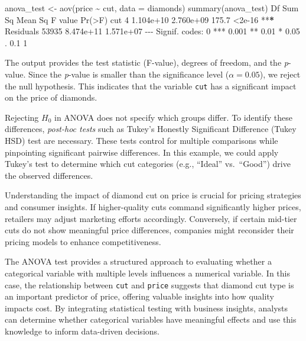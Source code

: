 \documentclass[
  11pt,
]{book}
\makeatletter
\newenvironment{Shaded}{}{}
\newcommand{\AttributeTok}[1]{#1}
\newcommand{\DecValTok}[1]{#1}
\newcommand{\ErrorTok}[1]{\textcolor[rgb]{0.21,0.21,0.21}{\textbf{#1}}}
\newcommand{\FloatTok}[1]{#1}
\newcommand{\FunctionTok}[1]{#1}
\newcommand{\NormalTok}[1]{#1}
\newcommand{\OtherTok}[1]{\textcolor[rgb]{0.39,0.39,0.39}{#1}}
\newcommand{\SpecialCharTok}[1]{\textcolor[rgb]{0.39,0.39,0.39}{#1}}
\newcommand{\StringTok}[1]{\textcolor[rgb]{0.39,0.39,0.39}{#1}}
\newenvironment{kframe}{%
\medskip{}
\setlength{\fboxsep}{.8em}
 \def\at@end@of@kframe{}%
 \ifinner\ifhmode%
  \def\at@end@of@kframe{\end{minipage}}%
  \begin{minipage}{\columnwidth}%
 \fi\fi%
 \def\FrameCommand##1{\hskip\@totalleftmargin \hskip-\fboxsep
 \colorbox{shadecolor}{##1}\hskip-\fboxsep
     \hskip-\linewidth \hskip-\@totalleftmargin \hskip\columnwidth}%
 \MakeFramed {\advance\hsize-\width
   \@totalleftmargin\z@ \linewidth\hsize
   \@setminipage}}%
 {\par\unskip\endMakeFramed%
 \at@end@of@kframe}
\renewenvironment{Shaded}{\begin{kframe}}{\end{kframe}}
\theoremstyle{definition}
\theoremstyle{definition}
\theoremstyle{definition}
\theoremstyle{definition}
\theoremstyle{remark}
\makeatother
\begin{document}
\begin{Shaded}
\begin{Highlighting}[]
\NormalTok{anova\_test }\OtherTok{\textless{}{-}} \FunctionTok{aov}\NormalTok{(price }\SpecialCharTok{\textasciitilde{}}\NormalTok{ cut, }\AttributeTok{data =}\NormalTok{ diamonds)}
\FunctionTok{summary}\NormalTok{(anova\_test)}
\NormalTok{                  Df    Sum Sq   Mean Sq F value }\FunctionTok{Pr}\NormalTok{(}\SpecialCharTok{\textgreater{}}\NormalTok{F)    }
\NormalTok{   cut             }\DecValTok{4} \FloatTok{1.104e+10} \FloatTok{2.760e+09}   \FloatTok{175.7} \SpecialCharTok{\textless{}}\FloatTok{2e{-}16} \SpecialCharTok{**}\ErrorTok{*}
\NormalTok{   Residuals   }\DecValTok{53935} \FloatTok{8.474e+11} \FloatTok{1.571e+07}                   
   \SpecialCharTok{{-}{-}{-}}
\NormalTok{   Signif. codes}\SpecialCharTok{:}  \DecValTok{0} \StringTok{\textquotesingle{}***\textquotesingle{}} \FloatTok{0.001} \StringTok{\textquotesingle{}**\textquotesingle{}} \FloatTok{0.01} \StringTok{\textquotesingle{}*\textquotesingle{}} \FloatTok{0.05} \StringTok{\textquotesingle{}.\textquotesingle{}} \FloatTok{0.1} \StringTok{\textquotesingle{} \textquotesingle{}} \DecValTok{1}
\end{Highlighting}
\end{Shaded}

The output provides the test statistic (F-value), degrees of freedom, and the \emph{p}-value. Since the \emph{p}-value is smaller than the significance level (\(\alpha = 0.05\)), we reject the null hypothesis. This indicates that the variable \texttt{cut} has a significant impact on the price of diamonds.

Rejecting \(H_0\) in ANOVA does not specify which groups differ. To identify these differences, \emph{post-hoc tests} such as Tukey's Honestly Significant Difference (Tukey HSD) test are necessary. These tests control for multiple comparisons while pinpointing significant pairwise differences. In this example, we could apply Tukey's test to determine which cut categories (e.g., ``Ideal'' vs.~``Good'') drive the observed differences.

Understanding the impact of diamond cut on price is crucial for pricing strategies and consumer insights. If higher-quality cuts command significantly higher prices, retailers may adjust marketing efforts accordingly. Conversely, if certain mid-tier cuts do not show meaningful price differences, companies might reconsider their pricing models to enhance competitiveness.

The ANOVA test provides a structured approach to evaluating whether a categorical variable with multiple levels influences a numerical variable. In this case, the relationship between \texttt{cut} and \texttt{price} suggests that diamond cut type is an important predictor of price, offering valuable insights into how quality impacts cost. By integrating statistical testing with business insights, analysts can determine whether categorical variables have meaningful effects and use this knowledge to inform data-driven decisions.
\end{document}
